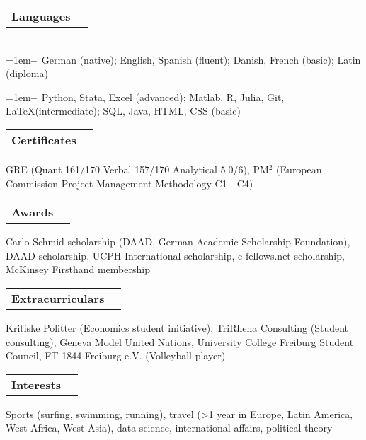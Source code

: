 \documentclass[A4,11pt]{article}
\makeatletter
\newcommand{\Subheading}[4]{   
    \begin{tabular*}{0.97\textwidth}[t]{l@{\extracolsep{\fill}}r}
      \textbf{#1}\textit{\small #2} & \small #3 
      \end{tabular*}
      \small #4 
    \vspace{7pt}}
\newcommand{\myitem}[1]{\hangindent=1em\hangafter=1\textbf{--}~#1\par}
\makeatother
\begin{document}
    \Subheading
        {Languages}{}{}
        {\\
        \myitem{German (native); English, Spanish (fluent); Danish, French (basic); Latin (diploma)}
        \myitem{Python, Stata, Excel (advanced); Matlab, R, Julia, Git, \LaTeX\space(intermediate); SQL, Java, HTML, CSS (basic)}
        }
    
    \Subheading
        {Certificates}{}{}
        {GRE (Quant 161/170 Verbal 157/170 Analytical 5.0/6),  
        PM$^2$ (European Commission Project Management Methodology C1 - C4)}

    \Subheading
        {Awards}{}{}
        {Carlo Schmid scholarship (DAAD, German Academic Scholarship Foundation), 
        DAAD scholarship, 
        UCPH International scholarship, 
        e-fellows.net scholarship, 
        McKinsey Firsthand membership} 

    \Subheading
        {Extracurriculars}{}{}
        {Kritiske Politter (Economics student initiative), TriRhena Consulting (Student consulting), 
        Geneva Model United Nations, University College Freiburg Student Council, FT 1844 Freiburg e.V. (Volleyball player)}{}

    \Subheading
        {Interests}{}{}
        {Sports (surfing, swimming, running), travel (>1 year in Europe, Latin America, West Africa, West Asia), data science, international affairs, political theory}

\vfill
{}
\end{document}
